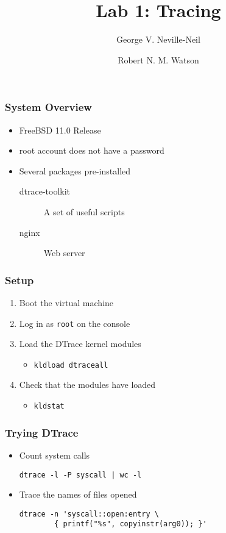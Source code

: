 \documentclass[pdftex,handout]{beamer}
\begin{document}

\title{Lab 1: Tracing}
\author[shortname]{George V. Neville-Neil \and Robert N. M. Watson}

\begin{frame}
  \titlepage
\end{frame}

\begin{frame}
  \frametitle{System Overview}
  \begin{itemize}
  \item FreeBSD 11.0 Release
  \item root account does not have a password
  \item Several packages pre-installed
    \begin{description}
    \item [dtrace-toolkit] A set of useful scripts
    \item[nginx] Web server
    \end{description}
  \end{itemize}
\end{frame}

\begin{frame}[fragile]
  \frametitle{Setup}
  \begin{enumerate}
  \item Boot the virtual machine
  \item Log in as \verb|root| on the console
  \item Load the DTrace kernel modules
    \begin{itemize}
    \item \verb|kldload dtraceall|
    \end{itemize}
  \item Check that the modules have loaded
    \begin{itemize}
    \item \verb|kldstat|
    \end{itemize}
  \end{enumerate}
\end{frame}

\begin{frame}[fragile]
  \frametitle{Trying DTrace}
  \begin{itemize}
  \item Count system calls
\begin{lstlisting}[basicstyle=\small,numbers=none]
dtrace -l -P syscall | wc -l
\end{lstlisting}
  \item Trace the names of files opened
\begin{lstlisting}[basicstyle=\small,numbers=none]
dtrace -n 'syscall::open:entry \
        { printf("%s", copyinstr(arg0)); }'
\end{lstlisting}
  \end{itemize}
\end{frame}
\end{document}
